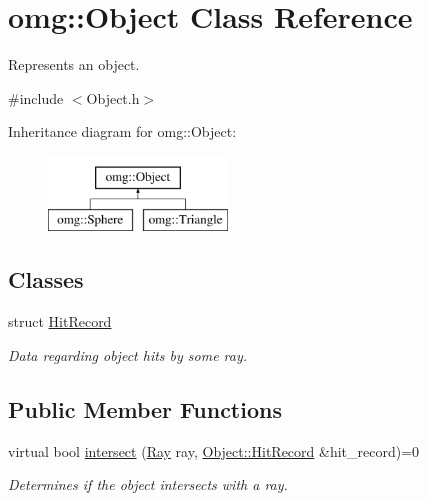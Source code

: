 \hypertarget{classomg_1_1_object}{}\section{omg\+::Object Class Reference}
\label{classomg_1_1_object}


Represents an object.  




{\ttfamily \#include $<$Object.\+h$>$}

Inheritance diagram for omg\+::Object\+:\begin{figure}[H]
\begin{center}
\leavevmode
\includegraphics[height=2.000000cm]{classomg_1_1_object}
\end{center}
\end{figure}
\subsection*{Classes}
\begin{DoxyCompactItemize}
\item 
struct \mbox{\hyperlink{structomg_1_1_object_1_1_hit_record}{Hit\+Record}}
\begin{DoxyCompactList}\small\item\em Data regarding object hits by some ray. \end{DoxyCompactList}\end{DoxyCompactItemize}
\subsection*{Public Member Functions}
\begin{DoxyCompactItemize}
\item 
virtual bool \mbox{\hyperlink{classomg_1_1_object_aa51d05f4952f3645dc88d5bcc52fed43}{intersect}} (\mbox{\hyperlink{classomg_1_1_ray}{Ray}} ray, \mbox{\hyperlink{structomg_1_1_object_1_1_hit_record}{Object\+::\+Hit\+Record}} \&hit\+\_\+record)=0
\begin{DoxyCompactList}\small\item\em Determines if the object intersects with a ray. \end{DoxyCompactList}\end{DoxyCompactItemize}


